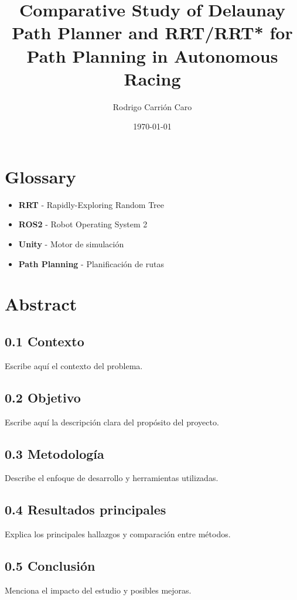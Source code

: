\documentclass[a4paper,12pt]{report}
\title{\textbf{Comparative Study of Delaunay Path Planner and RRT/RRT* for Path Planning in Autonomous Racing}}
\author{Rodrigo Carri\'on Caro}
\date{\today}
\begin{document}
\maketitle
{}
\newpage

\tableofcontents
\newpage

\chapter*{Glossary}
\begin{itemize}
    \item \textbf{RRT} - Rapidly-Exploring Random Tree
    \item \textbf{ROS2} - Robot Operating System 2
    \item \textbf{Unity} - Motor de simulación
    \item \textbf{Path Planning} - Planificación de rutas
\end{itemize}
\newpage

\chapter*{Abstract}
\section*{0.1 Contexto}
Escribe aquí el contexto del problema.

\section*{0.2 Objetivo}
Escribe aquí la descripción clara del propósito del proyecto.

\section*{0.3 Metodología}
Describe el enfoque de desarrollo y herramientas utilizadas.

\section*{0.4 Resultados principales}
Explica los principales hallazgos y comparación entre métodos.

\section*{0.5 Conclusión}
Menciona el impacto del estudio y posibles mejoras.
\newpage
\end{document}
